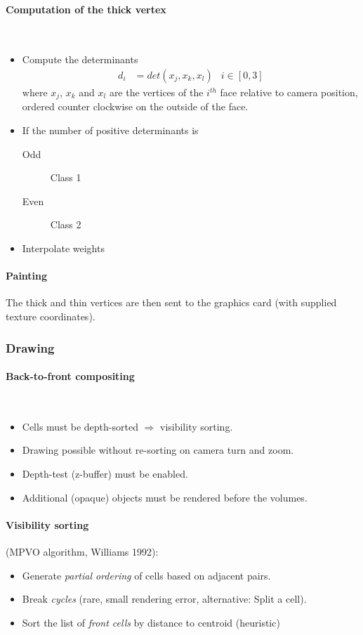 \paragraph{Computation of the thick vertex} $\ $
\begin{itemize}
    \item Compute the determinants 
        \begin{align*}
            d_i &= det(x_j, x_k, x_l) &i \in [0,3]
        \end{align*}
        where $x_j$, $x_k$ and $x_l$ are the vertices of the $i^{th}$ face relative to camera position, ordered counter clockwise on the outside of the face.
    \item If the number of positive determinants is 
        \begin{description}
            \item[Odd] Class 1
            \item[Even] Class 2
        \end{description}
    \item Interpolate weights 
\end{itemize}
\paragraph{Painting} The thick and thin vertices are then sent to the graphics card (with supplied texture coordinates). 
\subsubsection{Drawing}
\paragraph{Back-to-front compositing} $\ $
\begin{itemize}
    \item Cells must be depth-sorted $\Rightarrow$ visibility sorting.
    \item Drawing possible without re-sorting on camera turn and zoom.
    \item Depth-test (z-buffer) must be enabled.
    \item Additional (opaque) objects must be rendered before the volumes.
\end{itemize}
\paragraph{Visibility sorting} (MPVO algorithm, Williams 1992):
\begin{itemize}
    \item Generate \emph{partial ordering} of cells based on adjacent pairs.
    \item Break \emph{cycles} (rare, small rendering error, alternative: Split a cell).
    \item Sort the list of \emph{front cells} by distance to centroid (heuristic)
\end{itemize}

